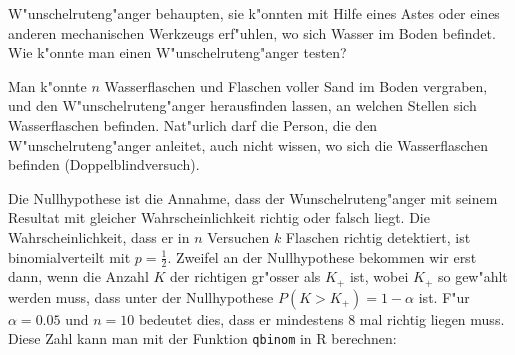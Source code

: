 W"unschelruteng"anger behaupten, sie k"onnten mit Hilfe eines Astes
oder eines anderen mechanischen Werkzeugs erf"uhlen, wo sich Wasser
im Boden befindet. Wie k"onnte man einen W"unschelruteng"anger testen?

\begin{loesung}
Man k"onnte $n$ Wasserflaschen und Flaschen voller Sand im Boden vergraben,
und den W"unschelruteng"anger herausfinden lassen, an welchen Stellen
sich Wasserflaschen befinden. Nat"urlich darf die Person, die den
W"unschelruteng"anger anleitet, auch nicht wissen, wo sich die
Wasserflaschen befinden (Doppelblindversuch).

Die Nullhypothese ist die Annahme, dass der Wunschelruteng"anger mit
seinem Resultat mit
gleicher Wahrscheinlichkeit richtig oder falsch liegt.
Die Wahrscheinlichkeit, dass er  in $n$ Versuchen
$k$ Flaschen richtig detektiert, ist
binomialverteilt mit $p=\frac12$.
Zweifel an der Nullhypothese bekommen wir erst
dann, wenn die Anzahl $K$ der richtigen gr"osser als $K_+$ ist, wobei
$K_+$ so gew"ahlt werden muss, dass unter der Nullhypothese
$P(K>K_+)=1-\alpha$ ist. F"ur $\alpha=0.05$ und $n=10$ bedeutet
dies, dass er mindestens 8 mal richtig liegen muss. Diese Zahl
kann man mit der Funktion {\tt qbinom} in R berechnen:
\end{loesung}

